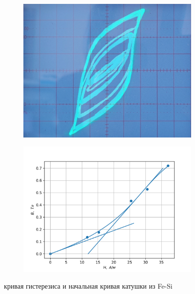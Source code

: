 \documentclass[14pt, a4paper]{report}
\begin{document}
\begin{figure}
	\centering
	\begin{subfigure}{.5\textwidth}
		\centering
		\includegraphics[width=\linewidth]{images/345_6.png}
	\end{subfigure}%
	\begin{subfigure}{.5\textwidth}
		\centering
		\includegraphics[width=\linewidth]{images/345_3.png}
	\end{subfigure}
	\caption{кривая гистерезиса и начальная кривая катушки из Fe-Si}
\end{figure}
\end{document}
